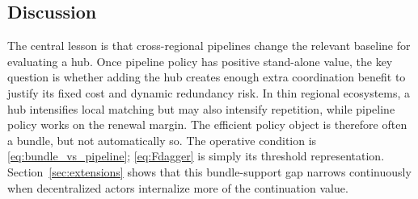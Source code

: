\subsection{Discussion}

The central lesson is that cross-regional pipelines change the relevant baseline for evaluating a hub. Once pipeline policy has positive stand-alone value, the key question is whether adding the hub creates enough extra coordination benefit to justify its fixed cost and dynamic redundancy risk. In thin regional ecosystems, a hub intensifies local matching but may also intensify repetition, while pipeline policy works on the renewal margin. The efficient policy object is therefore often a bundle, but not automatically so. The operative condition is \eqref{eq:bundle_vs_pipeline}; \eqref{eq:Fdagger} is simply its threshold representation. Section~\ref{sec:extensions} shows that this bundle-support gap narrows continuously when decentralized actors internalize more of the continuation value.
